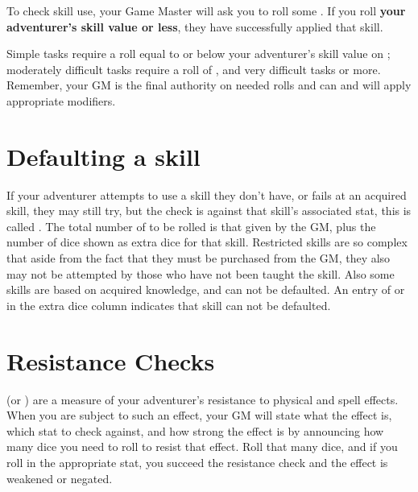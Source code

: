 \begin{multicols}{2}
To check skill use, your Game Master will ask you to roll some . If you roll \textbf{your adventurer's skill value or less}, they have successfully applied that skill.

Simple tasks require a roll equal to or below your adventurer's skill value on ; moderately difficult tasks require a roll of , and very difficult tasks  or more. Remember, your GM is the final authority on needed rolls and can and will apply appropriate modifiers.
\section{Defaulting a skill}
If your adventurer attempts to use a skill they don't have, or fails at an acquired skill, they may still try, but the check is against that skill's associated stat, this is called . The total number of  to be rolled is that given by the GM, plus the number of dice shown as extra dice for that skill. Restricted skills are so complex that aside from the fact that they must be purchased from the GM, they also may not be attempted by those who have not been taught the skill. Also some skills are based on acquired knowledge, and can not be defaulted. An entry of  or  in the extra dice column indicates that skill can not be defaulted.


\section{Resistance Checks}
 (or \RC) are a measure of your adventurer's resistance to physical and spell effects. When you are subject to such an effect, your GM will state what the effect is, which stat to check against, and how strong the effect is by announcing how many dice you need to roll to resist that effect. Roll that many dice, and if you roll  in the appropriate stat, you succeed the resistance check and the effect is weakened or negated.

\end{multicols}
